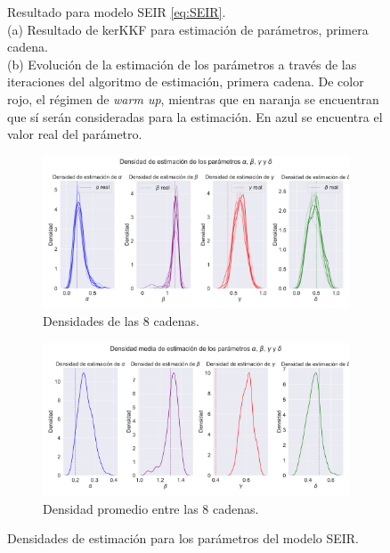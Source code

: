 \begin{figure}[h]
\begin{subfigure}[b]{0.49\textwidth}
         \caption{}
         \label{fig:nonlinear_filters_seir_params_evolution}
    \end{subfigure}
    \caption{Resultado para modelo SEIR \eqref{eq:SEIR}. \\
    (a) Resultado de kerKKF para estimación de parámetros, primera cadena. \\
    (b) Evolución de la estimación de los parámetros a través de las iteraciones del algoritmo de estimación, primera cadena. De color rojo, el régimen de \textit{warm up}, mientras que en naranja se encuentran que sí serán consideradas para la estimación. En azul se encuentra el valor real del parámetro.}
    \label{fig:SEIR}
\end{figure}

\begin{figure}[h]
    \centering
    \begin{subfigure}[b]{0.8\textwidth}
        \includegraphics[width=0.8\linewidth]{img/content/chapter4/nonlinear_filters_seir_params_density.pdf}
    \caption{Densidades de las 8 cadenas.}
    \label{fig:nonlinear_filters_sir_rec_params_density}
    \end{subfigure}
    \begin{subfigure}[b]{0.8\textwidth}
        \includegraphics[width=0.8\linewidth]{img/content/chapter4/nonlinear_filters_seir_params_density_mean.pdf}
    \caption{Densidad promedio entre las 8 cadenas.}
    \label{fig:nonlinear_filters_seir_params_density_mean}
    \end{subfigure}
    \caption{Densidades de estimación para los parámetros del modelo SEIR.}
\end{figure}

